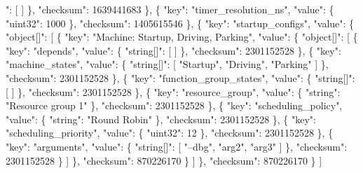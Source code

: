 \begin{DoxyItemize}
\begin{DoxyCode}
 [
    \{
        "key": "platform\_application",
        "value": \{
            "bool": false
        \},
        "checksum": 1639441683
    \},
    \{
        "key": "application\_states",
        "value": \{
            "string[]": [ ]
        \},
        "checksum": 1639441683
    \},
    \{
        "key": "timer\_resolution\_ns",
        "value": \{
            "uint32": 1000
        \},
        "checksum": 1405615546
    \},
    \{
        "key": "startup\_configs",
        "value": \{
            "object[]": [
                \{
                    "key": "Machine: Startup, Driving, Parking",
                    "value": \{
                        "object[]": [
                            \{
                                "key": "depends",
                                "value": \{
                                    "string[]": [ ]
                                \},
                                "checksum": 2301152528
                            \},
                            \{
                                "key": "machine\_states",
                                "value": \{
                                    "string[]": [ "Startup", "Driving", "Parking" ]
                                \},
                                "checksum": 2301152528
                            \},
                            \{
                                "key": "function\_group\_states",
                                "value": \{
                                    "string[]": [ ]
                                \},
                                "checksum": 2301152528
                            \},
                            \{
                                "key": "resource\_group",
                                "value": \{
                                    "string": "Resource group 1"
                                \},
                                "checksum": 2301152528
                            \},
                            \{
                                "key": "scheduling\_policy",
                                "value": \{
                                    "string": "Round Robin"
                                \},
                                "checksum": 2301152528
                            \},
                            \{
                                "key": "scheduling\_priority",
                                "value": \{
                                    "uint32": 12
                                \},
                                "checksum": 2301152528
                            \},
                            \{
                                "key": "arguments",
                                "value": \{
                                    "string[]": [ "--dbg", "arg2", "arg3" ]
                                \},
                                "checksum": 2301152528
                            \}
                        ]
                    \},
                    "checksum": 870226170
                \}
            ]
        \},
        "checksum": 870226170
    \}
]
\end{DoxyCode}


\end{DoxyItemize}
